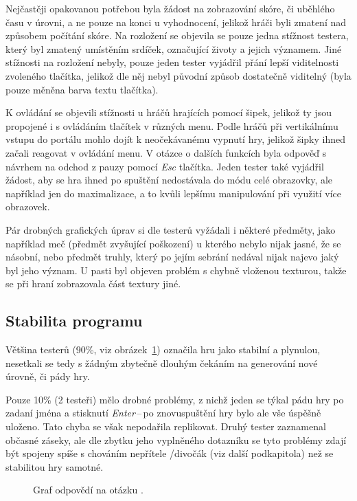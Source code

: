 Nejčastěji opakovanou potřebou byla žádost na zobrazování skóre, či uběhlého času v úrovni, a ne pouze na konci u vyhodnocení, jelikož hráči byli zmatení nad způsobem počítání skóre. Na rozložení se objevila se pouze jedna stížnost testera, který byl zmatený umístěním srdíček, označující životy a jejich významem. Jiné stížnosti na rozložení nebyly, pouze jeden tester vyjádřil přání lepší viditelnosti zvoleného tlačítka, jelikož dle něj nebyl původní způsob dostatečně viditelný (byla pouze měněna barva textu tlačítka).

K ovládání se objevili stížnosti u hráčů hrajících pomocí šipek, jelikož ty jsou propojené i s ovládáním tlačítek v různých menu. Podle hráčů při vertikálnímu vstupu do portálu mohlo dojít k neočekávanému vypnutí hry, jelikož šipky ihned začali reagovat v ovládání menu. V otázce o dalších funkcích byla odpověď s návrhem na odchod z pauzy pomocí \textit{Esc} tlačítka. Jeden tester také vyjádřil žádost, aby se hra ihned po spuštění nedostávala do módu celé obrazovky, ale například jen do maximalizace, a to kvůli lepšímu manipulování při využití více obrazovek.

Pár drobných grafických úprav si dle testerů vyžádali i některé předměty, jako například meč (předmět zvyšující poškození) u kterého nebylo nijak jasné, že se násobní, nebo předmět truhly, který po jejím sebrání nedával nijak najevo jaký byl jeho význam. U pasti byl objeven problém s chybně vloženou texturou, takže se při hraní zobrazovala část textury jiné.

\subsection*{Stabilita programu}
Většina testerů (90\%, viz obrázek~\ref{fig:hodnoceni_stabilita}) označila hru jako stabilní a plynulou, nesetkali se tedy s žádným zbytečně dlouhým čekáním na generování nové úrovně, či pády hry.

Pouze 10\% (2 testeři) mělo drobné problémy, z nichž jeden se týkal pádu hry po zadaní jména a stisknutí \textit{Enter}\,--\,po znovuspuštění hry bylo ale vše úspěšně uloženo. Tato chyba se však nepodařila replikovat. Druhý tester zaznamenal občasné záseky, ale dle zbytku jeho vyplněného dotazníku se tyto problémy zdají být spojeny spíše s chováním nepřítele /divočák (viz další podkapitola) než se stabilitou hry samotné.\\

\begin{figure}[hb]
    \centering
    \caption{Graf odpovědí na otázku .}
    \label{fig:hodnoceni_stabilita}
\end{figure}

